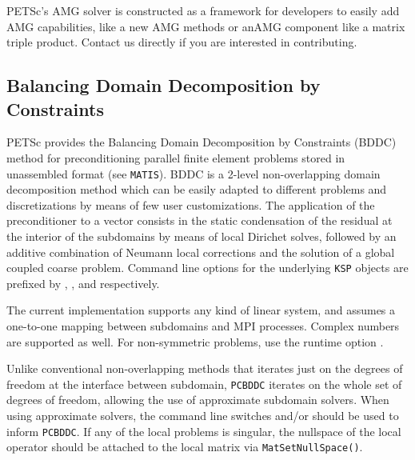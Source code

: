 PETSc's AMG solver is constructed as a framework for developers to
easily add AMG capabilities, like a new AMG methods or anAMG component like a matrix
triple product. Contact us directly if you are interested in contributing.

\subsection{Balancing Domain Decomposition by Constraints}

PETSc provides the Balancing Domain Decomposition by Constraints (BDDC) method for preconditioning
parallel finite element problems stored in unassembled format (see \lstinline{MATIS}). BDDC is a 2-level
non-overlapping domain decomposition method which can be easily adapted to different problems
and discretizations by means of few user customizations. The application of the preconditioner to a vector consists
in the static condensation of the residual at the interior of the subdomains by means of local Dirichet solves, followed by an
additive combination of Neumann local corrections and the solution of a global coupled coarse problem. 
Command line options for the underlying \lstinline{KSP} objects are prefixed by , ,
and  respectively.

The current implementation supports any kind of linear system, and assumes a one-to-one mapping between subdomains and
MPI processes. Complex numbers are supported as well. For non-symmetric problems, use the runtime option .

Unlike conventional non-overlapping methods that iterates just on the degrees of freedom at the interface between subdomain,
\lstinline{PCBDDC} iterates on the whole set of degrees of freedom, allowing the use of approximate subdomain solvers.
When using approximate solvers, the command line switches  and/or  should be used to inform \lstinline{PCBDDC}.
If any of the local problems is singular, the nullspace of the local operator should be attached to the local matrix via \lstinline{MatSetNullSpace()}.

